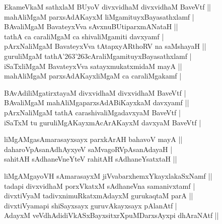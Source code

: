 \begin{entry}
\begin{shl}
EkameVkaM sathxlaM BUyoV divxvidhaM divxvidhaM BaveVtf ||\\
mahAliMgaM parxsAdAKayxM liMgamituyxBayasathxlamf |\\
BAvaliMgaM BavateyxVva sAvxnuBUtiparxmANataH ||\\
tathA ca caraliMgaM ca shivaliMgamiti davxyamf |\\
pArxNaliMgaM BavateyxVva tAtapxyARthoRV na saMshayaH ||\\
guruliMgaM tathA{\char'263\char'263}cAraliMgamituyxBayasathxlamf |\\
iSaTxliMgaM BavateyxVva satayxmukatxmidaM mayA ||\\
mahAliMgaM parxsAdAKayxliMgaM ca caraliMgakamf |
\end{shl}
\medskip
{}
\smallskip
\begin{shl}
BAvAdiliMgatirxtayaM divxvidhaM divxvidhaM BaveVtf |\\
BAvaliMgaM mahAliMgaparxsAdABiKayxkaM davxyamf ||\\
pArxNaliMgaM tathA carashivaliMgadavxyaM BaveVtf |\\
iSaTxM tu guruliMgAKayxmAcArAKayxM davxyaM BaveVtf |
\end{shl}
\medskip
{}
\smallskip
\begin{shl}
liMgAMgasAmarasayxsayx parxkArAH bahavoV mayA ||\\
daharoVpAsanAdhAyxyeV saMvagoRVpAsanAdayaH |\\
sahitAH sAdhaneVneYteV rahitAH sAdhaneYsatxtaH ||
\end{shl}
\medskip
{}
\smallskip
\begin{shl}
liMgAMgayoVH sAmarasayxM jiVvabarxhemxYkayxlakaSxNamf ||\\
tadapi divxvidhaM porxVkatxM sAdhaneVna samanivxtamf |\\
divxtiVyaM tadivxnimuRkatxmAdayxM gurukaqtaM parA ||\\
divxtiVyamapi shiSayxsayx guruvAkayxsayx pAlanAtf |\\
AdayxM veVdhAdidiVkASxBayxsitxrXpuMDarxsAyxpi dhAraNAtf ||
\end{shl}

\end{entry}
